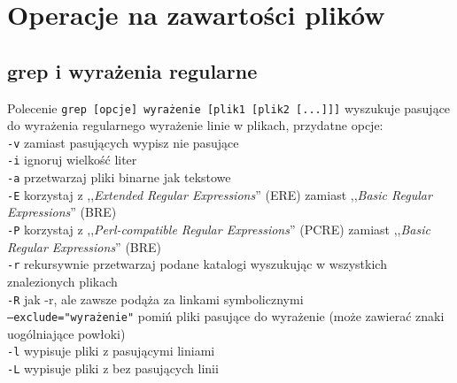 % 
% 
% 
% 

\section{Operacje na zawartości plików}

\subsection{grep i wyrażenia regularne}

Polecenie
\texttt{grep [opcje] wyrażenie [plik1 [plik2 [...]]]}
wyszukuje pasujące do wyrażenia regularnego wyrażenie linie w plikach, przydatne opcje:\\
	\texttt{-v} zamiast pasujących wypisz nie pasujące\\
	\texttt{-i} ignoruj wielkość liter\\
	\texttt{-a} przetwarzaj pliki binarne jak tekstowe\\
	\texttt{-E} korzystaj z ,,\emph{Extended Regular Expressions}'' (ERE) zamiast ,,\emph{Basic Regular Expressions}'' (BRE)\vspace{6pt}\\
	\texttt{-P} korzystaj z ,,\emph{Perl-compatible Regular Expressions}'' (PCRE) zamiast ,,\emph{Basic Regular Expressions}'' (BRE)\vspace{6pt}\\
	\texttt{-r} rekursywnie przetwarzaj podane katalogi wyszukując w wszystkich znalezionych plikach\\
	\texttt{-R} jak -r, ale zawsze podąża za linkami symbolicznymi\\
	\texttt{--exclude="wyrażenie"} pomiń pliki pasujące do wyrażenie (może zawierać znaki uogólniające powłoki)\vspace{6pt}\\
	\texttt{-l} wypisuje pliki z pasującymi liniami\\
	\texttt{-L} wypisuje pliki z bez pasujących linii


